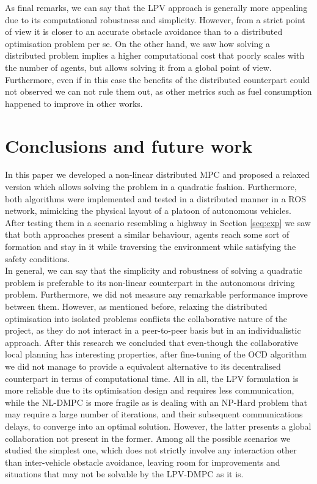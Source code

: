 \documentclass[a4paper,fleqn]{cas-sc}
\begin{document}
As final remarks, we can say that the LPV approach is generally more appealing due to its computational robustness and simplicity. However, from a strict point of view it is closer to an accurate obstacle avoidance than to a distributed optimisation problem per se. On the other hand, we saw how solving a distributed problem implies a higher computational cost that poorly scales with the number of agents, but allows solving it from a global point of view. Furthermore, even if in this case the benefits of the distributed counterpart could not observed we can not rule them out, as other metrics such as fuel consumption happened to improve in other works. 
\section{Conclusions and future work}
\label{sec:Conclusions} 

In this paper we developed a non-linear distributed MPC and proposed a relaxed version which allows solving the problem in a quadratic fashion. Furthermore, both algorithms were implemented and tested in a distributed manner in a ROS network, mimicking the physical layout of a platoon of autonomous vehicles. After testing them in a scenario resembling a highway in Section \ref{seq:exp} we saw that both approaches present a similar behaviour, agents reach some sort of formation and stay in it while traversing the environment while satisfying the safety conditions.\\ 

In general, we can say that the simplicity and robustness of solving a quadratic problem is preferable to its non-linear counterpart in the autonomous driving problem. Furthermore, we did not measure any remarkable performance improve between them. However, as mentioned before, relaxing the distributed optimisation into isolated problems conflicts the collaborative nature of the project, as they do not interact in a peer-to-peer basis but in an individualistic approach. After this research we concluded that even-though the collaborative local planning has interesting properties, after fine-tuning of the OCD algorithm we did not manage to provide a equivalent alternative to its decentralised counterpart in terms of computational time. All in all, the LPV formulation is more reliable due to its optimisation design and requires less communication, while the NL-DMPC is more fragile as is dealing with an NP-Hard problem that may require a large number of iterations, and their subsequent communications delays, to converge into an optimal solution. However, the latter presents a global collaboration not present in the former. Among all the possible scenarios we studied the simplest one, which does not strictly involve any interaction other than inter-vehicle obstacle avoidance, leaving room for improvements and situations that may not be solvable by the LPV-DMPC as it is.\\ 
\end{document}
